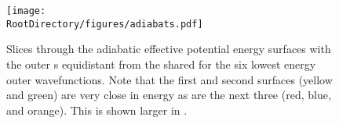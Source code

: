 \begin{figure}[ht]
\begin{center}
    \texttt{[image: \\RootDirectory/figures/adiabats.pdf]}
    \caption{
    Slices through the adiabatic effective potential energy surfaces with the outer \htwo{}s equidistant from the shared \hplus{} for the six lowest energy outer \htwo{} wavefunctions. Note that the first and second surfaces (yellow and green) are very close in energy as are the next three (red, blue, and orange). This is shown larger in .
}
\label{fig:adiabat_cuts}
\end{center}
\end{figure}
